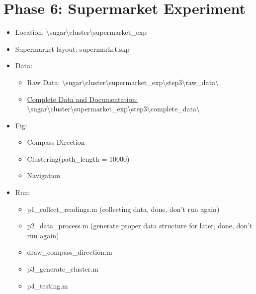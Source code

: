 \documentclass{article}
\begin{document}
\section{Phase 6: Supermarket Experiment}
\begin{itemize}
\item Location: \textbackslash sugar\textbackslash cluster\textbackslash supermarket\_exp
\item Supermarket layout: supermarket.skp
\item Data: 
	\begin{itemize}
	\item Raw Data: \textbackslash sugar\textbackslash cluster\textbackslash supermarket\_exp\textbackslash step3\textbackslash raw\_data\textbackslash
	\item \underline{\Large{Complete Data and Documentation:}}  \textbackslash sugar\textbackslash cluster\textbackslash supermarket\_exp\textbackslash step3\textbackslash complete\_data\textbackslash
	\end{itemize}
\item Fig:
	\begin{itemize}
	\item Compass Direction
	\item Clustering(path\_length = 10000) 
	\item Navigation
	\end{itemize}
\item Run: 
	\begin{itemize}
	\item p1\_collect\_readings.m (collecting data, done, don't run again)
	\item p2\_data\_process.m (generate proper data structure for later, done, don't run again)
	\item draw\_compass\_direction.m
	\item p3\_generate\_cluster.m 
	\item p4\_testing.m
	\end{itemize}
\end{itemize}
\end{document}
